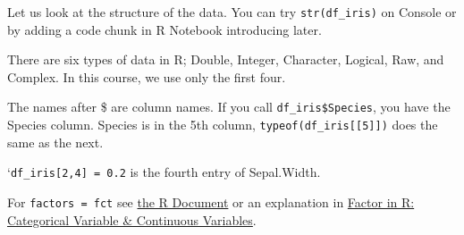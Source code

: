 \documentclass[
  xelatex, ja=standard]{bxjsbook}
\newenvironment{Shaded}{\begin{snugshade}}{\end{snugshade}}
\newcommand{\CommentTok}[1]{\textcolor[rgb]{0.56,0.35,0.01}{\textit{#1}}}
\newcommand{\FunctionTok}[1]{\textcolor[rgb]{0.13,0.29,0.53}{\textbf{#1}}}
\newcommand{\NormalTok}[1]{#1}
\newcommand{\SpecialCharTok}[1]{\textcolor[rgb]{0.81,0.36,0.00}{\textbf{#1}}}
\theoremstyle{definition}
\theoremstyle{definition}
\theoremstyle{definition}
\theoremstyle{definition}
\theoremstyle{remark}
\begin{document}
Let us look at the structure of the data. You can try \texttt{str(df\_iris)} on Console or by adding a code chunk in R Notebook introducing later.

\begin{Shaded}
\end{Shaded}

There are six types of data in R; Double, Integer, Character, Logical, Raw, and Complex. In this course, we use only the first four.

The names after \$ are column names. If you call \texttt{df\_iris\$Species}, you have the Species column. Species is in the 5th column, \texttt{typeof(df\_iris{[}{[}5{]}{]})} does the same as the next.

`\texttt{df\_iris{[}2,4{]}\ =\ \textasciigrave{}0.2} is the fourth entry of Sepal.Width.

\begin{Shaded}
\end{Shaded}

\begin{Shaded}
\end{Shaded}

For \texttt{factors\ =\ fct} see \href{https://www.rdocumentation.org/packages/base/versions/3.6.2/topics/factor}{the R Document} or an explanation in \href{https://www.guru99.com/r-factor-categorical-continuous.html}{Factor in R: Categorical Variable \& Continuous Variables}.
\end{document}
